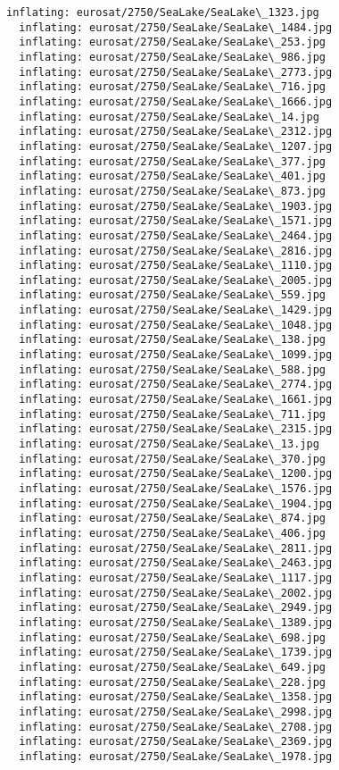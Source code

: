 \documentclass[11pt]{article}
\begin{document}
\begin{Verbatim}[commandchars=\\\{\}]
  inflating: eurosat/2750/SeaLake/SeaLake\_1323.jpg
  inflating: eurosat/2750/SeaLake/SeaLake\_1484.jpg
  inflating: eurosat/2750/SeaLake/SeaLake\_253.jpg
  inflating: eurosat/2750/SeaLake/SeaLake\_986.jpg
  inflating: eurosat/2750/SeaLake/SeaLake\_2773.jpg
  inflating: eurosat/2750/SeaLake/SeaLake\_716.jpg
  inflating: eurosat/2750/SeaLake/SeaLake\_1666.jpg
  inflating: eurosat/2750/SeaLake/SeaLake\_14.jpg
  inflating: eurosat/2750/SeaLake/SeaLake\_2312.jpg
  inflating: eurosat/2750/SeaLake/SeaLake\_1207.jpg
  inflating: eurosat/2750/SeaLake/SeaLake\_377.jpg
  inflating: eurosat/2750/SeaLake/SeaLake\_401.jpg
  inflating: eurosat/2750/SeaLake/SeaLake\_873.jpg
  inflating: eurosat/2750/SeaLake/SeaLake\_1903.jpg
  inflating: eurosat/2750/SeaLake/SeaLake\_1571.jpg
  inflating: eurosat/2750/SeaLake/SeaLake\_2464.jpg
  inflating: eurosat/2750/SeaLake/SeaLake\_2816.jpg
  inflating: eurosat/2750/SeaLake/SeaLake\_1110.jpg
  inflating: eurosat/2750/SeaLake/SeaLake\_2005.jpg
  inflating: eurosat/2750/SeaLake/SeaLake\_559.jpg
  inflating: eurosat/2750/SeaLake/SeaLake\_1429.jpg
  inflating: eurosat/2750/SeaLake/SeaLake\_1048.jpg
  inflating: eurosat/2750/SeaLake/SeaLake\_138.jpg
  inflating: eurosat/2750/SeaLake/SeaLake\_1099.jpg
  inflating: eurosat/2750/SeaLake/SeaLake\_588.jpg
  inflating: eurosat/2750/SeaLake/SeaLake\_2774.jpg
  inflating: eurosat/2750/SeaLake/SeaLake\_1661.jpg
  inflating: eurosat/2750/SeaLake/SeaLake\_711.jpg
  inflating: eurosat/2750/SeaLake/SeaLake\_2315.jpg
  inflating: eurosat/2750/SeaLake/SeaLake\_13.jpg
  inflating: eurosat/2750/SeaLake/SeaLake\_370.jpg
  inflating: eurosat/2750/SeaLake/SeaLake\_1200.jpg
  inflating: eurosat/2750/SeaLake/SeaLake\_1576.jpg
  inflating: eurosat/2750/SeaLake/SeaLake\_1904.jpg
  inflating: eurosat/2750/SeaLake/SeaLake\_874.jpg
  inflating: eurosat/2750/SeaLake/SeaLake\_406.jpg
  inflating: eurosat/2750/SeaLake/SeaLake\_2811.jpg
  inflating: eurosat/2750/SeaLake/SeaLake\_2463.jpg
  inflating: eurosat/2750/SeaLake/SeaLake\_1117.jpg
  inflating: eurosat/2750/SeaLake/SeaLake\_2002.jpg
  inflating: eurosat/2750/SeaLake/SeaLake\_2949.jpg
  inflating: eurosat/2750/SeaLake/SeaLake\_1389.jpg
  inflating: eurosat/2750/SeaLake/SeaLake\_698.jpg
  inflating: eurosat/2750/SeaLake/SeaLake\_1739.jpg
  inflating: eurosat/2750/SeaLake/SeaLake\_649.jpg
  inflating: eurosat/2750/SeaLake/SeaLake\_228.jpg
  inflating: eurosat/2750/SeaLake/SeaLake\_1358.jpg
  inflating: eurosat/2750/SeaLake/SeaLake\_2998.jpg
  inflating: eurosat/2750/SeaLake/SeaLake\_2708.jpg
  inflating: eurosat/2750/SeaLake/SeaLake\_2369.jpg
  inflating: eurosat/2750/SeaLake/SeaLake\_1978.jpg

\end{Verbatim}
\end{document}
